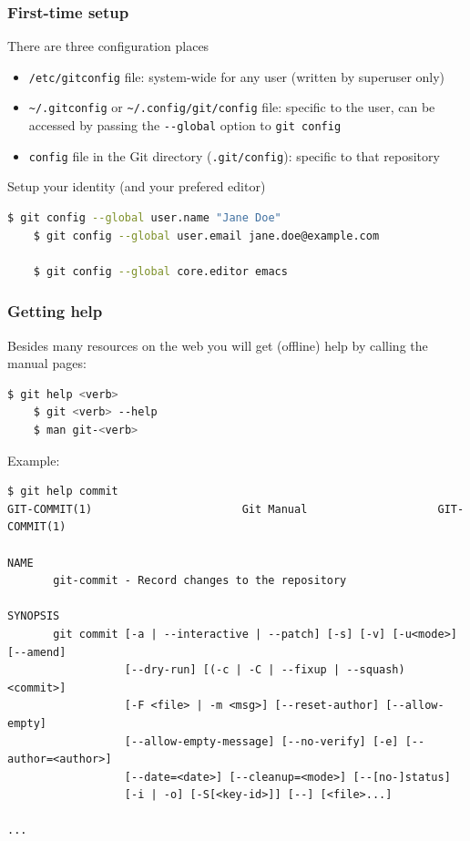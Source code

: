 \documentclass{beamer}
\begin{document}
\begin{frame}[fragile]
  \frametitle{First-time setup}
  There are three configuration places
  \begin{itemize}
    \item \lstinline{/etc/gitconfig} file: system-wide for any user (written by superuser only)
    \item \lstinline{~/.gitconfig} or \lstinline{~/.config/git/config} file: specific to the user, can be accessed by passing the \lstinline{--global} option to \lstinline{git config}
    \item \lstinline{config} file in the Git directory (\lstinline{.git/config}): specific to that repository
  \end{itemize}

  Setup your identity (and your prefered editor)
  \begin{lstlisting}[language=bash]
    $ git config --global user.name "Jane Doe"
    $ git config --global user.email jane.doe@example.com

    $ git config --global core.editor emacs
  \end{lstlisting}
\end{frame}

\begin{frame}[fragile]
  \frametitle{Getting help}
  Besides many resources on the web you will get (offline) help by calling the manual pages:

  \begin{lstlisting}[language=bash]
    $ git help <verb>
    $ git <verb> --help
    $ man git-<verb>
  \end{lstlisting}

  Example: 
  \begin{lstlisting}[basicstyle=\ttfamily\tiny]
$ git help commit
GIT-COMMIT(1)                       Git Manual                    GIT-COMMIT(1)

NAME
       git-commit - Record changes to the repository

SYNOPSIS
       git commit [-a | --interactive | --patch] [-s] [-v] [-u<mode>] [--amend]
                  [--dry-run] [(-c | -C | --fixup | --squash) <commit>]
                  [-F <file> | -m <msg>] [--reset-author] [--allow-empty]
                  [--allow-empty-message] [--no-verify] [-e] [--author=<author>]
                  [--date=<date>] [--cleanup=<mode>] [--[no-]status]
                  [-i | -o] [-S[<key-id>]] [--] [<file>...]

...
  \end{lstlisting}
\end{frame}
\end{document}

